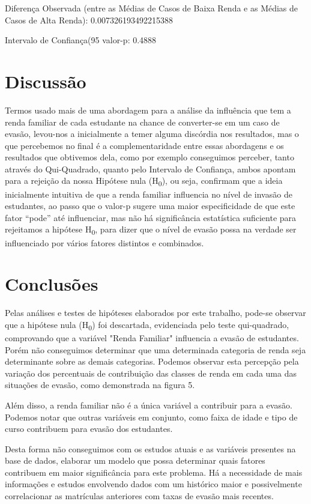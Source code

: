 \documentclass[conference]{IEEEtran}
\begin{document}
Diferença Observada (entre as Médias de Casos de Baixa Renda e as Médias de Casos de Alta Renda): 0.007326193492215388\par
Intervalo de Confiança(95%
valor-p: 0.4888

\section{Discussão}
Termos usado mais de uma abordagem para a análise da influência que tem a renda familiar de cada estudante na chance de converter-se em um caso de evasão, levou-nos a inicialmente a temer alguma discórdia nos resultados, mas o que percebemos no final é a complementaridade entre essas abordagens e os resultados que obtivemos dela, como por exemplo conseguimos perceber, tanto através do Qui-Quadrado, quanto pelo Intervalo de Confiança, ambos apontam para a rejeição da nossa Hipótese nula (H\textsubscript{0}), ou seja, confirmam que a ideia inicialmente intuitiva de que a renda familiar influencia no nível de invasão de estudantes, ao passo que o valor-p sugere uma maior especificidade de que este fator “pode” até influenciar, mas não há significância estatística suficiente para rejeitamos a hipótese H\textsubscript{0}, para dizer que o nível de evasão possa na verdade ser influenciado por vários fatores distintos e combinados. 

\section{Conclusões}
Pelas análises e testes de hipóteses elaborados por este trabalho, pode-se observar que a hipótese nula (H\textsubscript{0}) foi descartada, evidenciada pelo teste qui-quadrado, comprovando que a variável "Renda Familiar" influencia a evasão de estudantes. Porém não conseguimos determinar que uma determinada categoria de renda seja determinante sobre as demais categorias. Podemos observar esta percepção pela variação dos percentuais de contribuição das classes de renda em cada uma das situações de evasão, como demonstrada na figura 5.\par
Além disso, a renda familiar não é a única variável a contribuir para a evasão. Podemos notar que outras variáveis em conjunto, como faixa de idade e tipo de curso contribuem para evasão dos estudantes.\par
Desta forma não conseguimos com os estudos atuais e as variáveis presentes na base de dados, elaborar um modelo que possa determinar quais fatores contribuem em maior significância para este problema. Há a necessidade de mais informações e estudos envolvendo dados com um histórico maior e possivelmente correlacionar as matrículas anteriores com taxas de evasão mais recentes.
\end{document}
